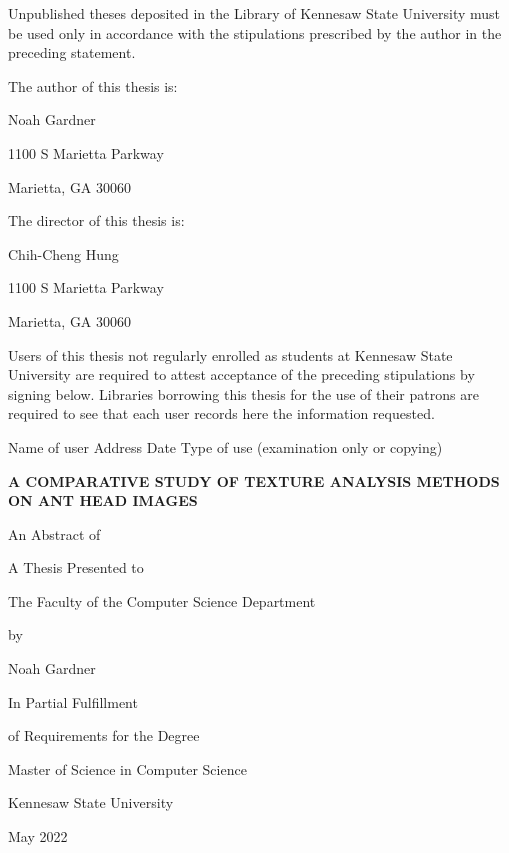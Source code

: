 \documentclass[12pt]{article}
\newcommand{\thesistitle}{
    {\Large A comparative study of texture analysis methods on
ant head images}
}
\begin{document}
\noindent Unpublished theses deposited in the Library of Kennesaw State
University must be used only in accordance with the stipulations prescribed by
the author in the preceding statement.
\vspace{0.5in}

\noindent The author of this thesis is:
\begin{center}
    Noah Gardner

    1100 S Marietta Parkway

    Marietta, GA 30060
\end{center}

\noindent The director of this thesis is:
\begin{center}
    Chih-Cheng Hung

    1100 S Marietta Parkway

    Marietta, GA 30060
\end{center}
\vspace{0.5in}

\noindent Users of this thesis not regularly enrolled as students at Kennesaw
State University are required to attest acceptance of the preceding stipulations
by signing below. Libraries borrowing this thesis for the use of their patrons
are required to see that each user records here the information requested.
\vspace{0.3in}

\noindent
Name of user \hspace{0.2in} Address \hspace{0.2in} Date \hspace{0.2in} Type of
use (examination only or copying)
\newpage

\begin{center}
    \textbf{\MakeUppercase{\thesistitle}}
    \vspace{1in}

    An Abstract of

    A Thesis Presented to

    The Faculty of the Computer Science Department
    \vspace{1in}

    by
    \vspace{0.5in}

    Noah Gardner
    \vspace{1in}

    In Partial Fulfillment

    of Requirements for the Degree

    Master of Science in Computer Science

    \vspace{1in}
    Kennesaw State University

    May 2022
\end{center}
\newpage
\end{document}
